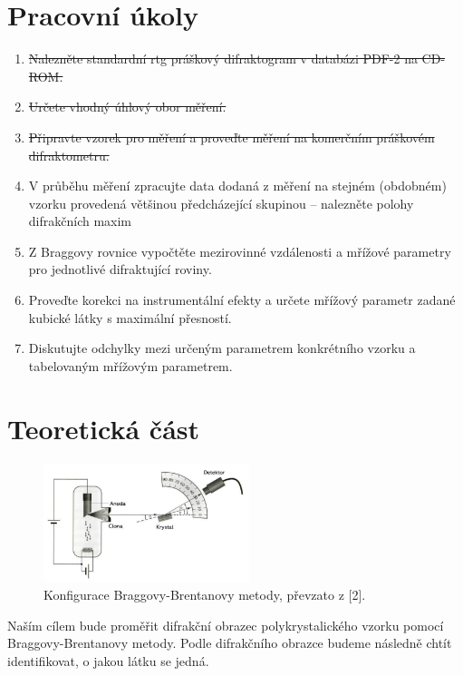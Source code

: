 \documentclass[10pt,a4paper]{article}
\newcommand{\°}{\degree}
\begin{document}

\setmainfont{Linux Libertine O}




\section{Pracovní úkoly}
\begin{enumerate}

    \item \st{Nalezněte standardní rtg práškový difraktogram v databázi PDF-2 na CD-ROM.}
    \item \st{Určete vhodný úhlový obor měření.}
    \item \st{Připravte vzorek pro měření a proveďte měření na komerčním práškovém difraktometru.}
    \item V průběhu měření zpracujte data dodaná z měření na stejném (obdobném) vzorku provedená většinou předcházející skupinou – nalezněte polohy difrakčních maxim
    \item Z Braggovy rovnice vypočtěte mezirovinné vzdálenosti a mřížové parametry pro jednotlivé difraktující roviny.
    \item Proveďte korekci na instrumentální efekty a určete mřížový parametr zadané kubické látky s maximální přesností.
    \item Diskutujte odchylky mezi určeným parametrem konkrétního vzorku a tabelovaným mřížovým parametrem.

\end{enumerate}

\section{Teoretická část}
\begin{figure}
    \centering
    \includegraphics[width=6cm]{danis-bragg.png}
    \caption{Konfigurace Braggovy-Brentanovy metody, převzato z [2].}
    \label{obr:danis-bragg}
\end{figure}

Naším cílem bude proměřit difrakční obrazec polykrystalického vzorku pomocí Braggovy-Brentanovy metody. Podle difrakčního obrazce budeme následně chtít identifikovat, o jakou látku se jedná.
\end{document}
